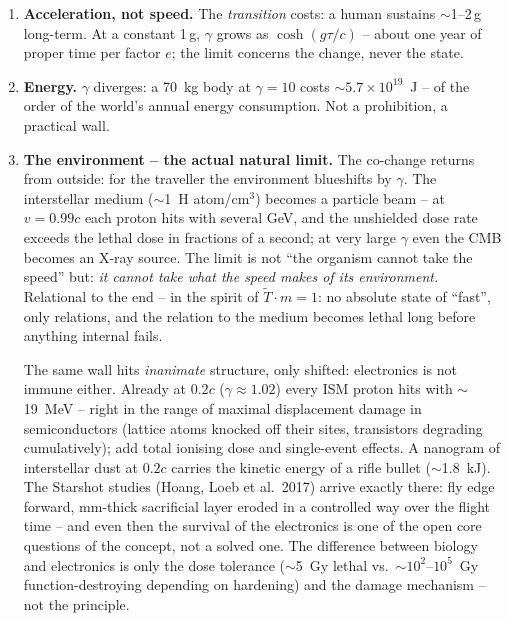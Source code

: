 \begin{enumerate}
  \item \textbf{Acceleration, not speed.} The \emph{transition}
        costs: a human sustains $\sim$1--2\,g long-term. At a
        constant 1\,g, $\gamma$ grows as $\cosh(g\tau/c)$ -- about
        one year of proper time per factor $e$; the limit concerns
        the change, never the state.
  \item \textbf{Energy.} $\gamma$ diverges: a 70~kg body at
        $\gamma = 10$ costs $\sim 5.7\times10^{19}$~J -- of the
        order of the world's annual energy consumption. Not a
        prohibition, a practical wall.
  \item \textbf{The environment -- the actual natural limit.} The
        co-change returns from outside: for the traveller the
        environment blueshifts by $\gamma$. The interstellar
        medium ($\sim$1~H atom/cm$^3$) becomes a particle beam --
        at $v = 0.99c$ each proton hits with several GeV, and the
        unshielded dose rate exceeds the lethal dose in fractions
        of a second; at very large $\gamma$ even the CMB becomes an
        X-ray source. The limit is not \enquote{the organism cannot
        take the speed} but: \emph{it cannot take what the speed
        makes of its environment.} Relational to the end -- in the
        spirit of $\tilde T \cdot m = 1$: no absolute state of
        \enquote{fast}, only relations, and the relation to the
        medium becomes lethal long before anything internal fails.

        The same wall hits \emph{inanimate} structure, only
        shifted: electronics is not immune either. Already at
        $0.2c$ ($\gamma \approx 1.02$) every ISM proton hits with
        $\sim$19~MeV -- right in the range of maximal displacement
        damage in semiconductors (lattice atoms knocked off their
        sites, transistors degrading cumulatively); add total
        ionising dose and single-event effects. A nanogram of
        interstellar dust at $0.2c$ carries the kinetic energy of
        a rifle bullet ($\sim$1.8~kJ). The Starshot studies
        (Hoang, Loeb et al.\ 2017) arrive exactly there: fly edge
        forward, mm-thick sacrificial layer eroded in a controlled
        way over the flight time -- and even then the survival of
        the electronics is one of the open core questions of the
        concept, not a solved one. The difference between biology
        and electronics is only the dose tolerance ($\sim$5~Gy
        lethal vs.\ $\sim$$10^2$--$10^5$~Gy function-destroying
        depending on hardening) and the damage mechanism -- not
        the principle.
\end{enumerate}

